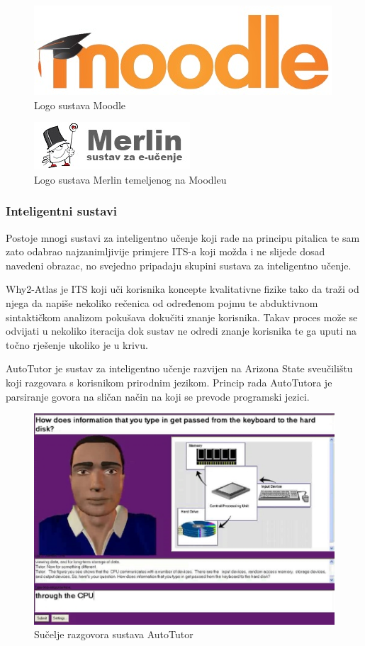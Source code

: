 \documentclass[times, utf8, zavrsni]{fer}
\begin{document}
\begin{figure}[htb]
	\centering
	\includegraphics[]{img/moodle.jpg}
	\caption{Logo sustava Moodle}
	\label{fig:moodle}
\end{figure}

\begin{figure}[htb]
	\centering
	\includegraphics[]{img/merlin.jpg}
	\caption{Logo sustava Merlin temeljenog na Moodleu}
	\label{fig:merlin}
\end{figure}

\subsubsection{Inteligentni sustavi}
Postoje mnogi sustavi za inteligentno učenje koji rade na principu pitalica te sam zato odabrao najzanimljivije primjere ITS-a koji možda i ne slijede dosad navedeni obrazac, no svejedno pripadaju skupini sustava za inteligentno učenje.
\par
Why2-Atlas je ITS koji uči korisnika koncepte kvalitativne fizike tako da traži od njega da napiše nekoliko rečenica od određenom pojmu te abduktivnom sintaktičkom analizom pokušava dokučiti znanje korisnika. Takav proces može se odvijati u nekoliko iteracija dok sustav ne odredi znanje korisnika te ga uputi na točno rješenje ukoliko je u krivu.
\par
AutoTutor je sustav za inteligentno učenje razvijen na Arizona State sveučilištu koji razgovara s korisnikom prirodnim jezikom. Princip rada AutoTutora je parsiranje govora na sličan način na koji se prevode programski jezici.

\begin{figure}[htb]
	\centering
	\includegraphics[]{img/autotutor.jpg}
	\caption{Sučelje razgovora sustava AutoTutor}
	\label{fig:autotutor}
\end{figure}
\end{document}
